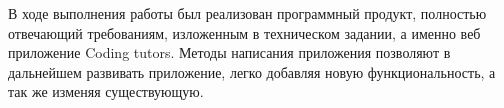 \Conclusion

В ходе выполнения работы был реализован программный продукт, полностью отвечающий требованиям, изложенным в техническом задании, а именно веб приложение Coding tutors. Методы написания приложения позволяют в дальнейшем развивать приложение, легко добавляя новую функциональность, а так же изменяя существующую. 
